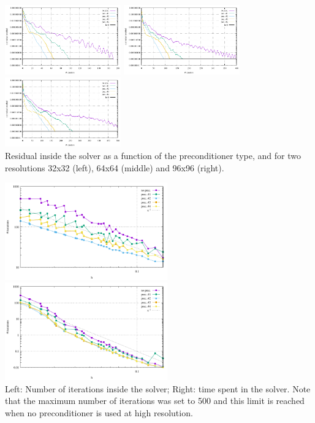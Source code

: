 \begin{center} 
\includegraphics[width=5cm]{python_codes/fieldstone_16/results/residual_32x32.pdf}
\includegraphics[width=5cm]{python_codes/fieldstone_16/results/residual_64x64.pdf}
\includegraphics[width=5cm]{python_codes/fieldstone_16/results/residual_96x96.pdf}\\
{\captionfont Residual inside the solver as a function of the preconditioner type, 
and for two resolutions 32x32 (left), 64x64 (middle) and 96x96 (right).}
\end{center}


\begin{center} 
\includegraphics[width=7cm]{python_codes/fieldstone_16/results/niterations.pdf}
\includegraphics[width=7cm]{python_codes/fieldstone_16/results/solve_time.pdf}\\
{\captionfont Left: Number of iterations inside the solver; 
Right: time spent in the solver. Note that the maximum number of iterations was set to 500 and this 
limit is reached when no preconditioner is used at high resolution.}
\end{center} 

